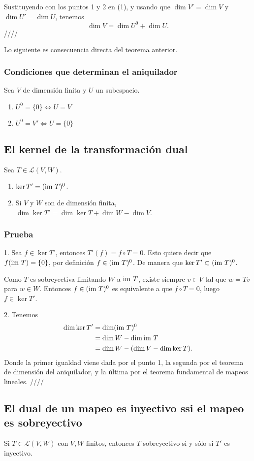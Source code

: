 \documentclass{article}
\begin{document}
Sustituyendo con los puntos 1 y 2 en (1), y usando que
$\dim V'=\dim V$ y $\dim U'= \dim U$, tenemos
$$\dim V = \dim U^0 + \dim U.$$
\hfill ////

Lo siguiente es consecuencia directa del teorema anterior.
\subsubsection{Condiciones que determinan el aniquilador}
\label{aniq}
Sea $V$ de dimensión finita y $U$ un subespacio.
\begin{enumerate}
    \item $U^0 = \{0\} \iff U=V$
    \item $U^0 = V' \iff U=\{0\}$
\end{enumerate}

\subsection{El kernel de la transformación dual}
\label{kerdual}
Sea $T\in\mathcal{L}(V,W)$.
\begin{enumerate}
    \item $\ker T' = (\text{im } T)^0$.
    \item Si $V$ y $W$ son de dimensión finita,
    $\dim\ker T' = \dim\ker T + \dim W - \dim V$.
\end{enumerate}
\subsubsection*{Prueba}
1. Sea $f\in\ker T'$, entonces $T'(f) = f\circ T = 0$.
Esto quiere decir que $f(\text{im } T) =\{0\}$, por definición
$f\in (\text{im } T)^0$. De manera que $\ker T' \subset (\text{im } T)^0$.

Como $T$ es sobreyectiva limitando $W$ a $\text{im } T$,
existe siempre $v\in V$ tal que $w= Tv$ para $w\in W$. Entonces 
$f\in (\text{im } T)^0$ es equivalente a que $f\circ T = 0$, luego
$f\in\ker T'$.

2. Tenemos
\begin{align*}
    \dim\ker T' &= \dim (\text{im } T)^0\\
    &= \dim W - \dim \text{im } T\\
    &= \dim W - (\dim V - \dim\ker T).
\end{align*}
Donde la primer igualdad viene dada por el punto 1,
la segunda por el teorema de dimensión del aniquilador, 
y la última por el teorema fundamental de mapeos lineales.
\hfill ////

\subsection{El dual de un mapeo es inyectivo ssi el mapeo es sobreyectivo}
Si $T\in\mathcal{L}(V,W)$ con $V,W$ finitos, entonces
$T$ sobreyectivo si y sólo si $T'$ es inyectivo.
\end{document}

